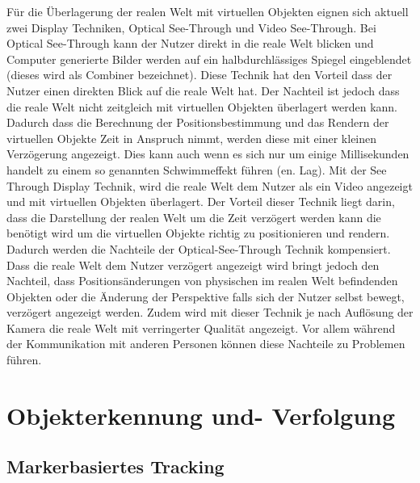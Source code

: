 \cite{Tonnis2010} Für die Überlagerung der realen Welt mit virtuellen Objekten eignen sich aktuell zwei Display Techniken, Optical See-Through und Video See-Through. 
Bei Optical See-Through kann der Nutzer direkt in die reale Welt blicken und Computer generierte Bilder werden auf ein halbdurchlässiges Spiegel eingeblendet (dieses wird als Combiner bezeichnet).
Diese Technik hat den Vorteil dass der Nutzer einen direkten Blick auf die reale Welt hat. Der Nachteil ist jedoch dass die reale Welt nicht zeitgleich mit virtuellen Objekten überlagert werden kann. 
Dadurch dass die Berechnung der Positionsbestimmung und das Rendern der virtuellen Objekte Zeit in Anspruch nimmt, werden diese mit einer kleinen Verzögerung angezeigt. Dies kann auch 
wenn es sich nur um einige Millisekunden handelt zu einem so genannten Schwimmeffekt führen (en. Lag). Mit der See Through Display Technik, wird die reale Welt dem Nutzer als ein Video 
angezeigt und mit virtuellen Objekten überlagert. Der Vorteil dieser Technik liegt darin, dass die Darstellung der realen Welt um die Zeit verzögert werden kann die benötigt wird um die virtuellen Objekte 
richtig zu positionieren und rendern. Dadurch werden die Nachteile der Optical-See-Through Technik kompensiert. Dass die reale Welt dem Nutzer verzögert angezeigt wird bringt jedoch den Nachteil, 
dass Positionsänderungen von physischen im realen Welt befindenden Objekten oder die Änderung der Perspektive falls sich der Nutzer selbst bewegt, verzögert angezeigt werden. Zudem wird mit 
dieser Technik je nach Auflösung der Kamera die reale Welt mit verringerter Qualität angezeigt. \cite[S.~368]{DieterSchmalstieg2016} Vor allem während der Kommunikation mit anderen Personen können diese 
Nachteile zu Problemen führen. 

\section{Objekterkennung und- Verfolgung}



\subsection{Markerbasiertes Tracking}


